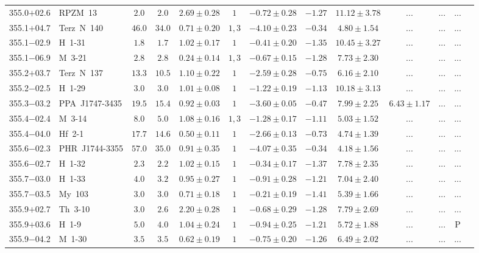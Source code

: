 \documentclass[useAMS]{mn2e}
\begin{document}
\begin{center}
{\begin{longtable}{llccccccccccc}
355.0$+$02.6&RPZM~13&$       2.0$&$       2.0$&$2.69 \pm 0.28$&$1$&$-0.72 \pm 0.28$&$     -1.27$&$11.12 \pm 3.78$&$...$&$...$&...\\
355.1$+$04.7&Terz~N~140&$      46.0$&$      34.0$&$0.71 \pm 0.20$&$1,3$&$-4.10 \pm 0.23$&$     -0.34$&$4.80 \pm 1.54$&$...$&$...$&...\\
355.1$-$02.9&H~1-31&$       1.8$&$       1.7$&$1.02 \pm 0.17$&$1$&$-0.41 \pm 0.20$&$     -1.35$&$10.45 \pm 3.27$&$...$&$...$&...\\
355.1$-$06.9&M~3-21&$       2.8$&$       2.8$&$0.24 \pm 0.14$&$1,3$&$-0.67 \pm 0.15$&$     -1.28$&$7.73 \pm 2.30$&$...$&$...$&...\\
355.2$+$03.7&Terz~N~137&$      13.3$&$      10.5$&$1.10 \pm 0.22$&$1$&$-2.59 \pm 0.28$&$     -0.75$&$6.16 \pm 2.10$&$...$&$...$&...\\
355.2$-$02.5&H~1-29&$       3.0$&$       3.0$&$1.01 \pm 0.08$&$1$&$-1.22 \pm 0.19$&$     -1.13$&$10.18 \pm 3.13$&$...$&$...$&...\\
355.3$-$03.2&PPA~J1747-3435&$      19.5$&$      15.4$&$0.92 \pm 0.03$&$1$&$-3.60 \pm 0.05$&$     -0.47$&$7.99 \pm 2.25$&$6.43 \pm 1.17$&$...$&...\\
355.4$-$02.4&M~3-14&$       8.0$&$       5.0$&$1.08 \pm 0.16$&$1,3$&$-1.28 \pm 0.17$&$     -1.11$&$5.03 \pm 1.52$&$...$&$...$&...\\
355.4$-$04.0&Hf~2-1&$      17.7$&$      14.6$&$0.50 \pm 0.11$&$1$&$-2.66 \pm 0.13$&$     -0.73$&$4.74 \pm 1.39$&$...$&$...$&...\\
355.6$-$02.3&PHR~J1744-3355&$      57.0$&$      35.0$&$0.91 \pm 0.35$&$1$&$-4.07 \pm 0.35$&$     -0.34$&$4.18 \pm 1.56$&$...$&$...$&...\\
355.6$-$02.7&H~1-32&$       2.3$&$       2.2$&$1.02 \pm 0.15$&$1$&$-0.34 \pm 0.17$&$     -1.37$&$7.78 \pm 2.35$&$...$&$...$&...\\
355.7$-$03.0&H~1-33&$       4.0$&$       3.2$&$0.95 \pm 0.27$&$1$&$-0.91 \pm 0.28$&$     -1.21$&$7.04 \pm 2.40$&$...$&$...$&...\\
355.7$-$03.5&My~103&$       3.0$&$       3.0$&$0.71 \pm 0.18$&$1$&$-0.21 \pm 0.19$&$     -1.41$&$5.39 \pm 1.66$&$...$&$...$&...\\
355.9$+$02.7&Th~3-10&$       3.0$&$       2.6$&$2.20 \pm 0.28$&$1$&$-0.68 \pm 0.29$&$     -1.28$&$7.79 \pm 2.69$&$...$&$...$&...\\
355.9$+$03.6&H~1-9&$       5.0$&$       4.0$&$1.04 \pm 0.24$&$1$&$-0.94 \pm 0.25$&$     -1.21$&$5.72 \pm 1.88$&$...$&$...$&P\\
355.9$-$04.2&M~1-30&$       3.5$&$       3.5$&$0.62 \pm 0.19$&$1$&$-0.75 \pm 0.20$&$     -1.26$&$6.49 \pm 2.02$&$...$&$...$&...\\

\end{longtable}}
\end{center}
\end{document}
